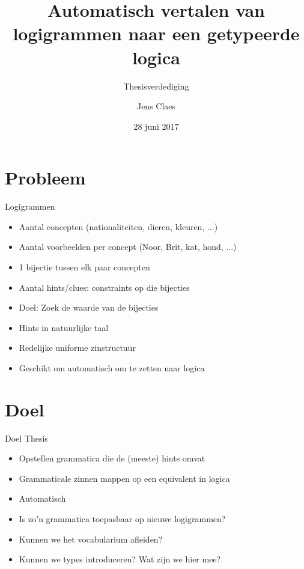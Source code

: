 \documentclass[notes, dvipsnames]{beamer}
\title{Automatisch vertalen van logigrammen naar een getypeerde logica}
\subtitle{Thesisverdediging}
\author{Jens Claes}
\date{28 juni 2017}
\newcommand{\seperation}{
	\vspace{1em}
	\ppause
}
\newcommand{\hitem}{
	\ppause
	\item
}
\newcommand{\ppause}{\onslide<+>}
\begin{document}
	\frame{\titlepage}
	\section{Probleem}
	\begin{frame}{Logigrammen}
		\begin{itemize}
      \hitem Aantal concepten (nationaliteiten, dieren, kleuren, ...)
      \item Aantal voorbeelden per concept (Noor, Brit, kat, hond, ...)
      \item 1 bijectie tussen elk paar concepten
      \item Aantal hints/clues: constraints op die bijecties
			\hitem Doel: Zoek de waarde van de bijecties
			
			\seperation
			
			\item Hints in natuurlijke taal
      \item Redelijke uniforme zinstructuur
			
			\seperation

      \item Geschikt om automatisch om te zetten naar logica
		\end{itemize}
	\end{frame}
	
	\section{Doel}
	\begin{frame}{Doel Thesis}
		\begin{itemize}
			\hitem Opstellen grammatica die de (meeste) hints omvat
			\item Grammaticale zinnen mappen op een equivalent in logica
      \item Automatisch
			
			\seperation
      \item Is zo'n grammatica toepasbaar op nieuwe logigrammen?
      \item Kunnen we het vocabularium afleiden?
      \item Kunnen we types introduceren? Wat zijn we hier mee?
		\end{itemize}
	\end{frame}
\end{document}
